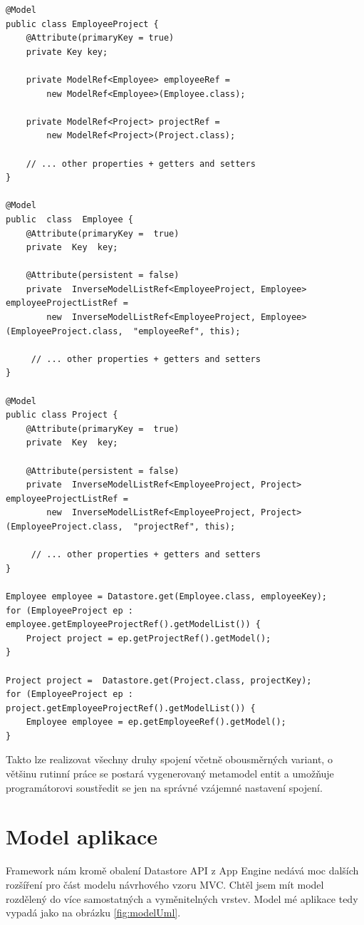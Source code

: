 \begin{lstlisting}[caption={Ukázka many-to-many vztahu s použitím spojovací entitní třídy},label=lst:manyToManyJoinTable,belowcaptionskip=0.4cm]
@Model
public class EmployeeProject {
	@Attribute(primaryKey = true)
	private Key key;

	private ModelRef<Employee> employeeRef = 
		new ModelRef<Employee>(Employee.class);

	private ModelRef<Project> projectRef = 
		new ModelRef<Project>(Project.class);

	// ... other properties + getters and setters
}

@Model
public  class  Employee {
	@Attribute(primaryKey =  true)
	private  Key  key;

	@Attribute(persistent = false)
	private  InverseModelListRef<EmployeeProject, Employee>  employeeProjectListRef =
		new  InverseModelListRef<EmployeeProject, Employee>(EmployeeProject.class,  "employeeRef", this);

     // ... other properties + getters and setters
}

@Model
public class Project {
	@Attribute(primaryKey =  true)
	private  Key  key;

	@Attribute(persistent = false)
	private  InverseModelListRef<EmployeeProject, Project>  employeeProjectListRef =
		new  InverseModelListRef<EmployeeProject, Project>(EmployeeProject.class,  "projectRef", this);

     // ... other properties + getters and setters
}

Employee employee = Datastore.get(Employee.class, employeeKey);
for (EmployeeProject ep : employee.getEmployeeProjectRef().getModelList()) {
	Project project = ep.getProjectRef().getModel();
}

Project project =  Datastore.get(Project.class, projectKey);
for (EmployeeProject ep : project.getEmployeeProjectRef().getModelList()) {
	Employee employee = ep.getEmployeeRef().getModel();
}
\end{lstlisting}

Takto lze realizovat všechny druhy spojení včetně obousměrných variant, o většinu rutinní práce se postará vygenerovaný metamodel entit a umožňuje programátorovi soustředit se jen na správné vzájemné nastavení spojení.

\section{Model aplikace}
Framework nám kromě obalení Datastore API z App Engine nedává moc dalších rozšíření pro část modelu návrhového vzoru MVC. Chtěl jsem mít model rozdělený do více samostatných a vyměnitelných vrstev. Model mé aplikace tedy vypadá jako na obrázku \ref{fig:modelUml}.

